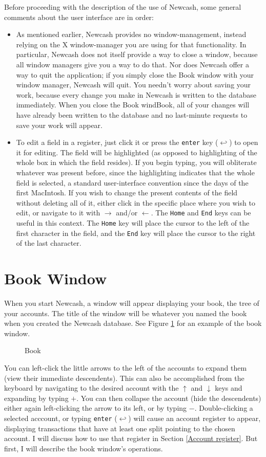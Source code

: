 \documentclass{report}
\newcommand{\graphicsfig}[5]{
\begin{figure}[#5]
\begin{center}
\resizebox{#1}{!}{\texttt{[image: \#2]}}
\end{center}
\caption{#3}
\label{#4}
\end{figure}
}
\begin{document}
Before proceeding with the description of the use of Newcash, some general comments about the user interface are in order:
\begin{itemize}
\item As mentioned earlier, Newcash provides no window-management, instead relying on the X window-manager you are using for that functionality. In particular, Newcash does not itself provide a way to close a window, because all window managers give you a way to do that. Nor does Newcash offer a way to quit the application; if you simply close the Book window with your window manager, Newcash will quit. You needn't worry about saving your work, because every change you make in Newcash is written to the database immediately. When you close the Book windBook, all of your changes will have already been written to the database and no last-minute requests to save your work will appear.
\item To edit a field in a register, just click it or press the \verb|enter| key ($\hookleftarrow$) to open it for editing. The field will be highlighted (as opposed to highlighting of the whole box in which the field resides). If you begin typing, you will obliterate whatever was present before, since the highlighting indicates that the whole field is selected, a standard user-interface convention since the days of the first MacIntosh. If you wish to change the present contents of the field without deleting all of it, either click in the specific place where you wish to edit, or navigate to it with $\rightarrow$ and/or $\leftarrow$. The \verb|Home| and \verb|End| keys can be useful in this context. The \verb|Home| key will place the cursor to the left of the first character in the field, and the \verb|End| key will place the cursor to the right of the last character.
\end{itemize}

\section{Book Window}
When you start Newcash, a window will appear displaying your book, the tree of your accounts. The title of the window will be whatever you named the book when you created the Newcash database. See Figure \ref{Book} for an example of the book window. 
\graphicsfig{5in}{figures/book.png}{Book}{Book}{} 
You can left-click the little arrows to the left of the accounts to expand them (view their immediate descendents). This can also be accomplished from the keyboard by navigating to the desired account with the $\uparrow$ and $\downarrow$ keys and expanding by typing $+$. You can then collapse the account (hide the descendents) either again left-clicking the arrow to its left, or by typing $-$. Double-clicking a selected acccount, or typing \verb|enter| ($\hookleftarrow$) will cause an account register to appear, displaying transactions that have at least one split pointing to the chosen account. I will discuss how to use that register in Section \ref{Account register}. But first, I will describe the book window's operations.
\end{document}
